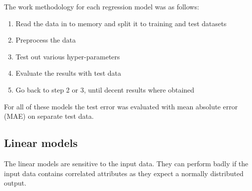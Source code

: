 \documentclass[a4paper]{article}
\begin{document}
The work methodology for each regression model was as follows:
\begin{enumerate}
  \item Read the data in to memory and split it to training and test datasets
  \item Preprocess the data
  \item Test out various hyper-parameters
  \item Evaluate the results with test data
  \item Go back to step 2 or 3, until decent results where obtained
\end{enumerate}
For all of these models the test error was evaluated with mean absolute error (MAE) on separate test data.

\subsection{Linear models}
The linear models are sensitive to the input data. They can perform badly if the input data contains correlated attributes as they expect a normally distributed output.
\end{document}
